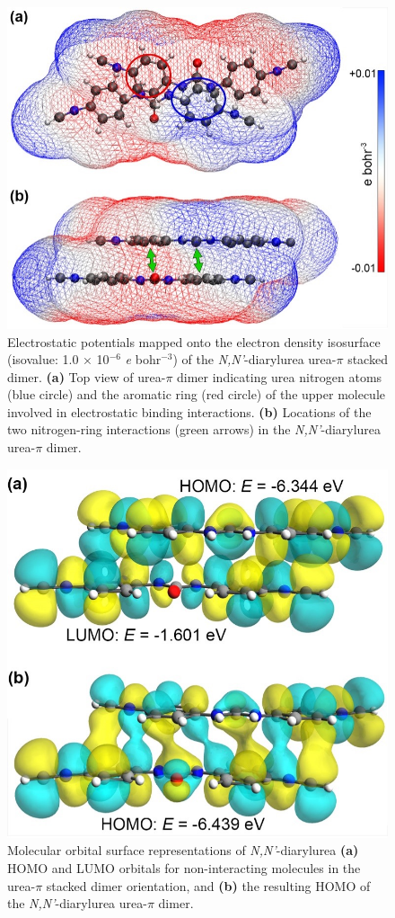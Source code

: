 \begin{figure}[h!]
    \centering
    \includegraphics[width=0.8\linewidth]{figures/pub2/esp-surface.jpg}
    \caption{Electrostatic potentials mapped onto the electron density isosurface (isovalue: 1.0 × 10$^{-6}$ \textit{e} bohr$^{-3}$) of the \textit{N,N'}-diarylurea urea-$\pi$ stacked dimer. \textbf{(a)} Top view of urea-$\pi$ dimer indicating urea nitrogen atoms (blue circle) and the aromatic ring (red circle) of the upper molecule involved in electrostatic binding interactions. \textbf{(b)} Locations of the two nitrogen-ring interactions (green arrows) in the \textit{N,N'}-diarylurea urea-$\pi$ dimer.}\label{esp-surface}
\end{figure}

\begin{figure}[h!]
    \centering
    \includegraphics[width=0.8\linewidth]{figures/pub2/mo-surface.jpg}
    \caption{Molecular orbital surface representations of \textit{N,N'}-diarylurea \textbf{(a)} HOMO and LUMO orbitals for non-interacting molecules in the urea-$\pi$ stacked dimer orientation, and \textbf{(b)} the resulting HOMO of the \textit{N,N'}-diarylurea urea-$\pi$ dimer.}\label{mo-surface}
\end{figure}

